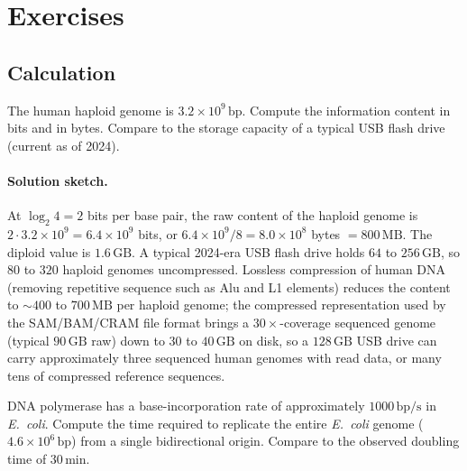 \section{Exercises}

\subsection*{Calculation}

\begin{exercise}
The human haploid genome is $3.2 \times 10^9\,\text{bp}$. Compute
the information content in bits and in bytes. Compare to the storage
capacity of a typical USB flash drive (current as of 2024).
\end{exercise}

\paragraph{Solution sketch.} At $\log_2 4 = 2$ bits per base pair,
the raw content of the haploid genome is
$2 \cdot 3.2 \times 10^9 = 6.4 \times 10^9$ bits, or
$6.4 \times 10^9 / 8 = 8.0 \times 10^8$ bytes $= 800\,\text{MB}$.
The diploid value is $1.6\,\text{GB}$. A typical 2024-era USB flash
drive holds $64$ to $256\,\text{GB}$, so $80$ to $320$ haploid
genomes uncompressed. Lossless compression of human DNA (removing
repetitive sequence such as Alu and L1 elements) reduces the
content to $\sim 400$ to $700\,\text{MB}$ per haploid genome; the
compressed representation used by the SAM/BAM/CRAM file format
brings a $30\times$-coverage sequenced genome (typical $90\,\text{GB}$
raw) down to $30$ to $40\,\text{GB}$ on disk, so a $128\,\text{GB}$
USB drive can carry approximately three sequenced human genomes
with read data, or many tens of compressed reference sequences.

\begin{exercise}
DNA polymerase has a base-incorporation rate of approximately
$1000\,\text{bp}/\text{s}$ in \emph{E.~coli}. Compute the time
required to replicate the entire \emph{E.~coli} genome
($4.6 \times 10^6\,\text{bp}$) from a single bidirectional origin.
Compare to the observed doubling time of $30\,\text{min}$.
\end{exercise}

